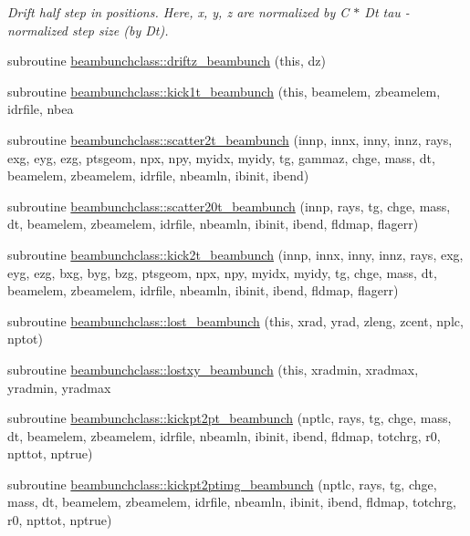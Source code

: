 \begin{DoxyCompactItemize}
\begin{DoxyCompactList}\small\item\em Drift half step in positions. Here, x, y, z are normalized by C $\ast$ Dt tau -\/ normalized step size (by Dt). \end{DoxyCompactList}\item 
subroutine \mbox{\hyperlink{namespacebeambunchclass_a653727137cda46af62ebf20a0bcb9ab8}{beambunchclass\+::driftz\+\_\+beambunch}} (this, dz)
\item 
subroutine \mbox{\hyperlink{namespacebeambunchclass_ac4e7c6a08c052c9bbc3c2bb1703adea6}{beambunchclass\+::kick1t\+\_\+beambunch}} (this, beamelem, zbeamelem, idrfile, nbea
\item 
subroutine \mbox{\hyperlink{namespacebeambunchclass_a4353d7ca4b2e80df2e71209df5b0e36c}{beambunchclass\+::scatter2t\+\_\+beambunch}} (innp, innx, inny, innz, rays, exg, eyg, ezg, ptsgeom, npx, npy, myidx, myidy, tg, gammaz, chge, mass, dt, beamelem, zbeamelem, idrfile, nbeamln, ibinit, ibend)
\item 
subroutine \mbox{\hyperlink{namespacebeambunchclass_a950cb67b3fefb93f3d3a492fdef5b998}{beambunchclass\+::scatter20t\+\_\+beambunch}} (innp, rays, tg, chge, mass, dt, beamelem, zbeamelem, idrfile, nbeamln, ibinit, ibend, fldmap, flagerr)
\item 
subroutine \mbox{\hyperlink{namespacebeambunchclass_a13904891d2d14b332c4178871e861363}{beambunchclass\+::kick2t\+\_\+beambunch}} (innp, innx, inny, innz, rays, exg, eyg, ezg, bxg, byg, bzg, ptsgeom, npx, npy, myidx, myidy, tg, chge, mass, dt, beamelem, zbeamelem, idrfile, nbeamln, ibinit, ibend, fldmap, flagerr)
\item 
subroutine \mbox{\hyperlink{namespacebeambunchclass_a7cccd378d69c7b51808b6d96d3151e50}{beambunchclass\+::lost\+\_\+beambunch}} (this, xrad, yrad, zleng, zcent, nplc, nptot)
\item 
subroutine \mbox{\hyperlink{namespacebeambunchclass_a68be93e06f8b6c65ee45af2e08610396}{beambunchclass\+::lostxy\+\_\+beambunch}} (this, xradmin, xradmax, yradmin, yradmax
\item 
subroutine \mbox{\hyperlink{namespacebeambunchclass_a8a635f6138c645606329c5c4b81bdf51}{beambunchclass\+::kickpt2pt\+\_\+beambunch}} (nptlc, rays, tg, chge, mass, dt, beamelem, zbeamelem, idrfile, nbeamln, ibinit, ibend, fldmap, totchrg, r0, npttot, nptrue)
\item 
subroutine \mbox{\hyperlink{namespacebeambunchclass_a01fdab4efb6d28b0604dfadfdbf302c1}{beambunchclass\+::kickpt2ptimg\+\_\+beambunch}} (nptlc, rays, tg, chge, mass, dt, beamelem, zbeamelem, idrfile, nbeamln, ibinit, ibend, fldmap, totchrg, r0, npttot, nptrue)

\end{DoxyCompactItemize}
